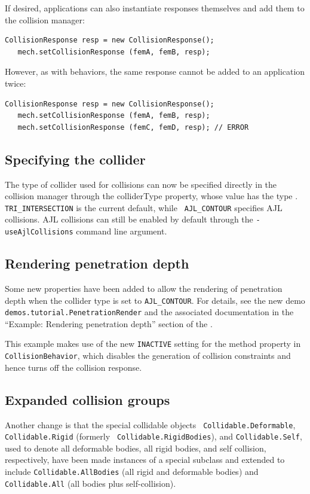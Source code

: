 \documentclass{article}
\begin{document}
If desired, applications can also instantiate responses themselves and
add them to the collision manager:
%
\begin{lstlisting}[]
   CollisionResponse resp = new CollisionResponse();
   mech.setCollisionResponse (femA, femB, resp);
\end{lstlisting}
%
However, as with behaviors, the same response cannot be
added to an application twice:
%
\begin{lstlisting}[]
   CollisionResponse resp = new CollisionResponse();
   mech.setCollisionResponse (femA, femB, resp);
   mech.setCollisionResponse (femC, femD, resp); // ERROR
\end{lstlisting}
%

\subsection*{Specifying the collider}

The type of collider used for collisions can now be specified directly
in the collision manager through the {\sf colliderType} property,
whose value has the type
.
{\tt TRI\_INTERSECTION} is the current default, while {\tt
AJL\_CONTOUR} specifies AJL collisions. AJL collisions can still be
enabled by default through the {\tt -useAjlCollisions} command line
argument.

\subsection*{Rendering penetration depth}

Some new properties have been added to allow the rendering of
penetration depth when the collider type is set to {\tt AJL\_CONTOUR}.
For details, see the new demo {\tt demos.tutorial.PenetrationRender}
and the associated documentation in the ``Example: Rendering
penetration depth'' section of the
.

This example makes use of the new {\tt INACTIVE} setting for the {\sf
method} property in {\tt CollisionBehavior}, which disables the
generation of collision constraints and hence turns off the collision
response.

\subsection*{Expanded collision groups}

Another change is that the special collidable objects {\tt
Collidable.Deformable}, {\tt Collidable.Rigid} (formerly {\tt
Collidable.RigidBodies}), and {\tt Collidable.Self}, used to denote
all deformable bodies, all rigid bodies, and self collision,
respectively, have been made instances of a special subclass
 and extended
to include {\tt Collidable.AllBodies} (all rigid and deformable
bodies) and {\tt Collidable.All} (all bodies plus self-collision).
\end{document}
